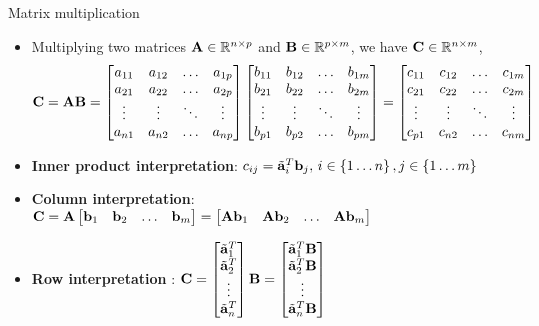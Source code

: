 \documentclass[aspectratio=169]{beamer}
\def\mf{\ensuremath\mathbf}
\begin{document}
\begin{frame}[t]{Matrix multiplication}
\begin{itemize}
\item Multiplying two matrices $\mf{A} \in \mathbb{R}^{n \times p}$ and $\mf{B} \in \mathbb{R}^{p \times m}$, we have $\mf{C} \in \mathbb{R}^{n \times m}$,
\[ \mf{C} = \mf{A}\mf{B} = \begin{bmatrix}
a_{11} & a_{12} & \ldots & a_{1p} \\
a_{21} & a_{22} & \ldots & a_{2p} \\
\vdots & \vdots & \ddots & \vdots \\
a_{n1} & a_{n2} & \ldots & a_{np} \\
\end{bmatrix} \begin{bmatrix}
b_{11} & b_{12} & \ldots & b_{1m} \\
b_{21} & b_{22} & \ldots & b_{2m} \\
\vdots & \vdots & \ddots & \vdots \\
b_{p1} & b_{p2} & \ldots & b_{pm} \\
\end{bmatrix} = \begin{bmatrix}
c_{11} & c_{12} & \ldots & c_{1m} \\
c_{21} & c_{22} & \ldots & c_{2m} \\
\vdots & \vdots & \ddots & \vdots \\
c_{p1} & c_{n2} & \ldots & c_{nm} \\
\end{bmatrix}\]
\item \textbf{Inner product interpretation}: $c_{ij} = \tilde{\mf{a}}_i^T\mf{b}_j, \, i \in \left\{1 \ldots n\right\}, j \in \left\{1 \ldots m\right\}$
\item \textbf{Column interpretation}: $\mf{C} = \mf{A} \begin{bmatrix}
\mf{b}_{1} & \mf{b}_{2} & \ldots & \mf{b}_{m}
\end{bmatrix} = \begin{bmatrix}
\mf{A}\mf{b}_{1} & \mf{A}\mf{b}_{2} & \ldots & \mf{A}\mf{b}_{m}
\end{bmatrix}$
\item \textbf{Row interpretation} : $\mf{C} = \begin{bmatrix}
\tilde{\mf{a}}_{1}^T\\
\tilde{\mf{a}}_{2}^T\\
\vdots\\
\tilde{\mf{a}}_{n}^T\\
\end{bmatrix} \mf{B} = \begin{bmatrix}
\tilde{\mf{a}}_{1}^T\mf{B}\\
\tilde{\mf{a}}_{2}^T\mf{B}\\
\vdots\\
\tilde{\mf{a}}_{n}^T\mf{B}\\
\end{bmatrix}$
\end{itemize}
\end{frame}
\end{document}
